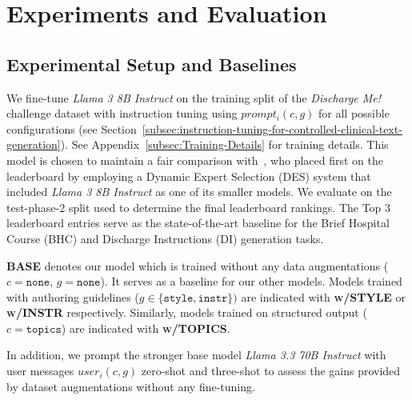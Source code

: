\section{Experiments and Evaluation}
\vspace{-0.4em}
\subsection{Experimental Setup and Baselines}

We fine-tune \textit{Llama 3 8B Instruct} on the training split of the \textit{Discharge Me!} challenge dataset with instruction tuning using $prompt_i(c, g)$ for all possible configurations (see Section~\ref{subsec:instruction-tuning-for-controlled-clinical-text-generation}). See Appendix~\ref{subsec:Training-Details} for training details. This model is chosen to maintain a fair comparison with~\citet{damm-etal-2024-wispermed}, who placed first on the leaderboard by employing a Dynamic Expert Selection (DES) system that included \textit{Llama 3 8B Instruct} as one of its smaller models. We evaluate on the test-phase-2 split used to determine the final leaderboard rankings. The Top 3 leaderboard entries serve as the state-of-the-art baseline for the Brief Hospital Course (BHC) and Discharge Instructions (DI) generation tasks.

\textbf{BASE} denotes our model which is trained without any data augmentations ($c = \texttt{none}$, $g = \texttt{none}$). It serves as a baseline for our other models. Models trained with authoring guidelines ($g \in \{\texttt{style}, \texttt{instr}\})$ are indicated with \textbf{\textsc{w/STYLE}} or \textbf{\textsc{w/INSTR}} respectively. Similarly, models trained on structured output ($c = \texttt{topics}$) are indicated with \textbf{\textsc{w/TOPICS}}.

In addition, we prompt the stronger base model \textit{Llama 3.3 70B Instruct} with user messages $user_i(c, g)$ zero-shot and three-shot to assess the gains provided by dataset augmentations without any fine-tuning.


